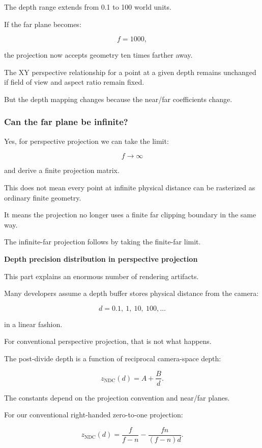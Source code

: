 The depth range extends from 0.1 to 100 world units.

If the far plane becomes:

\[
 f=1000,
\]

the projection now accepts geometry ten times farther away.

The XY perspective relationship for a point at a given depth remains unchanged if field of view and aspect ratio remain fixed.

But the depth mapping changes because the near/far coefficients change.

\subsubsection{Can the far plane be infinite?}\label{can-the-far-plane-be-infinite}

Yes, for perspective projection we can take the limit:

\[
 f\to\infty
\]

and derive a finite projection matrix.

This does not mean every point at infinite physical distance can be rasterized as ordinary finite geometry.

It means the projection no longer uses a finite far clipping boundary in the same way.

The infinite-far projection follows by taking the finite-far limit.

\textbf{Depth precision distribution in perspective projection}

This part explains an enormous number of rendering artifacts.

Many developers assume a depth buffer stores physical distance from the camera:

\[
 d=0.1,\ 1,\ 10,\ 100,\ldots
\]

in a linear fashion.

For conventional perspective projection, that is not what happens.

The post-divide depth is a function of reciprocal camera-space depth:

\[
 \boxed{ z_{\mathrm{NDC}}(d)=A+\frac Bd }.
\]

The constants depend on the projection convention and near/far planes.

For our conventional right-handed zero-to-one projection:

\[
 \boxed{ z_{\mathrm{NDC}}(d) = \frac f{f-n} - \frac{fn}{(f-n)d} }.
\]

